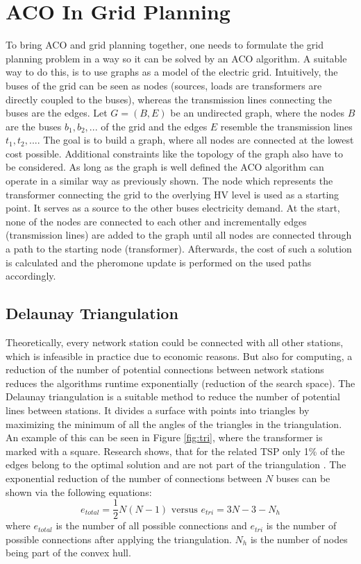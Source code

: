 \section{ACO In Grid Planning}

To bring ACO and grid planning together, one needs to formulate the grid planning problem in a way so it can be solved by an ACO algorithm. A suitable way to do this, is to use graphs as a model of the electric grid. Intuitively, the buses of the grid can be seen as nodes (sources, loads are transformers are directly coupled to the buses), whereas the transmission lines connecting the buses are the edges. Let $G = (B, E)$ be an undirected graph, where the nodes $B$ are the buses $b_1, b_2, ...$ of the grid and the edges $E$ resemble the transmission lines $t_1, t_2, ...$. The goal is to build a graph, where all nodes are connected at the lowest cost possible. Additional constraints like the topology of the graph also have to be considered. As long as the graph is well defined the ACO algorithm can operate in a similar way as previously shown.
The node which represents the transformer connecting the grid to the overlying HV level is used as a starting point. It serves as a source to the other buses electricity demand. At the start, none of the nodes are connected to each other and incrementally edges (transmission lines) are added to the graph until all nodes are connected through a path to the starting node (transformer). Afterwards, the cost of such a solution is calculated and the pheromone update is performed on the used paths accordingly.

\subsection{Delaunay Triangulation}\label{triangulation}
Theoretically, every network station could be connected with all other stations, which is infeasible in practice due to economic reasons. But also for computing, a reduction of the number of potential connections between network stations reduces the algorithms runtime exponentially (reduction of the search space). The Delaunay triangulation is a suitable method to reduce the number of potential lines between stations. It divides a surface with points into triangles by maximizing the minimum of all the angles of the triangles in the triangulation.
An example of this can be seen in Figure \ref{fig:tri}, where the transformer is marked with a square. Research shows, that for the related TSP only 1\% of the edges belong to the optimal solution and are not part of the triangulation \cite{schmitting2000traveling}. The exponential reduction of the number of connections between $N$ buses can be shown via the following equations:
$$e_{total} = \frac{1}{2}N(N-1)\text{ versus }e_{tri} = 3N - 3 - N_h$$
where $e_{total}$ is the number of all possible connections and $e_{tri}$ is the number of possible connections after applying the triangulation. $N_h$ is the number of nodes being part of the convex hull. \\

